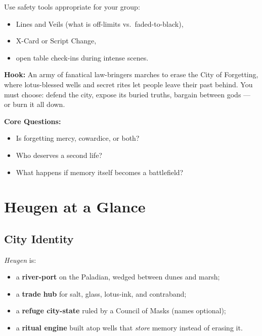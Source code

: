 \documentclass[11pt]{article}
\newcommand{\Place}[1]{\textit{#1}}
\begin{document}
Use safety tools appropriate for your group:
\begin{itemize}[leftmargin=*]
  \item Lines and Veils (what is off-limits vs.\ faded-to-black),
  \item X-Card or Script Change,
  \item open table check-ins during intense scenes.
\end{itemize}

\begin{tcolorbox}[title=\textbf{Player-Facing Summary},colback=blue!5!white,colframe=blue!60!black,breakable]
\textbf{Hook:} An army of fanatical law-bringers marches to erase the City of Forgetting, where lotus-blessed wells and secret rites let people leave their past behind. You must choose: defend the city, expose its buried truths, bargain between gods --- or burn it all down.

\textbf{Core Questions:}
\begin{itemize}
  \item Is forgetting mercy, cowardice, or both?
  \item Who deserves a second life?
  \item What happens if memory itself becomes a battlefield?
\end{itemize}
\end{tcolorbox}

\section{Heugen at a Glance}
\label{sec:heugen}

\subsection*{City Identity}

\Place{Heugen} is:
\begin{itemize}[leftmargin=*]
  \item a \textbf{river-port} on the Paladian, wedged between dunes and marsh;
  \item a \textbf{trade hub} for salt, glass, lotus-ink, and contraband;
  \item a \textbf{refuge city-state} ruled by a Council of Masks (names optional);
  \item a \textbf{ritual engine} built atop wells that \emph{store} memory instead of erasing it.
\end{itemize}
\end{document}
